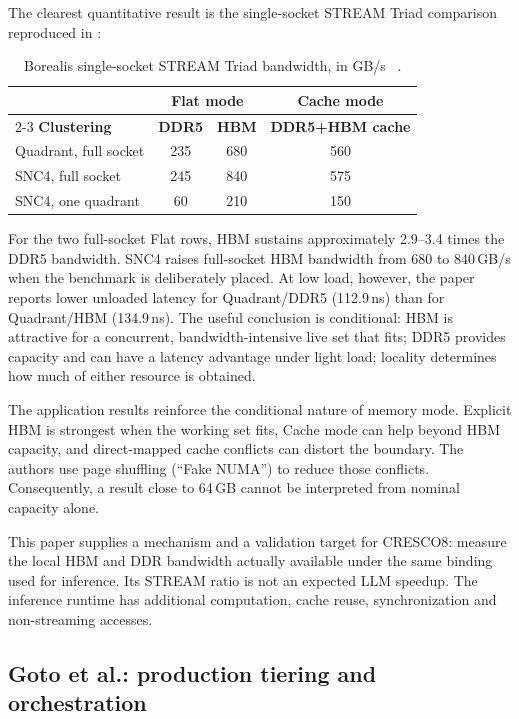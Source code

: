 The clearest quantitative result is the single-socket STREAM Triad
comparison reproduced in :

\begin{table}[htbp]
\centering
\small
\tabsetup
\caption{Borealis single-socket STREAM Triad bandwidth, in GB/s
~\cite{ibeid2025aurora}.}
\label{tab:stream-critical}
\begin{tabular}{@{}lccc@{}}
\toprule
\headrow
& \multicolumn{2}{c}{\textbf{Flat mode}} & \textbf{Cache mode} \\
\cmidrule(lr){2-3}
\textbf{Clustering} & \textbf{DDR5} & \textbf{HBM} & \textbf{DDR5+HBM cache} \\
\midrule
Quadrant, full socket & 235 & 680 & 560 \\
SNC4, full socket     & 245 & 840 & 575 \\
SNC4, one quadrant    &  60 & 210 & 150 \\
\bottomrule
\end{tabular}
\end{table}

For the two full-socket Flat rows, HBM sustains approximately
2.9--3.4 times the DDR5 bandwidth.  SNC4 raises full-socket HBM
bandwidth from 680 to 840\,GB/s when the benchmark is deliberately
placed.  At low load, however, the paper reports lower unloaded latency
for Quadrant/DDR5 (112.9\,ns) than for Quadrant/HBM (134.9\,ns).  The
useful conclusion is conditional: HBM is attractive for a concurrent,
bandwidth-intensive live set that fits; DDR5 provides capacity and can
have a latency advantage under light load; locality determines how
much of either resource is obtained.

The application results reinforce the conditional nature of memory
mode.  Explicit HBM is strongest when the working set fits, Cache mode
can help beyond HBM capacity, and direct-mapped cache conflicts can
distort the boundary.  The authors use page shuffling (``Fake NUMA'')
to reduce those conflicts.  Consequently, a result close to 64\,GB
cannot be interpreted from nominal capacity alone.

This paper supplies a mechanism and a validation target for CRESCO8:
measure the local HBM and DDR bandwidth actually available under the
same binding used for inference.  Its STREAM ratio is not an expected
LLM speedup.  The inference runtime has additional computation, cache
reuse, synchronization and non-streaming accesses.

\subsection{Goto et al.: production tiering and orchestration}
\label{sec:goto-critical}

